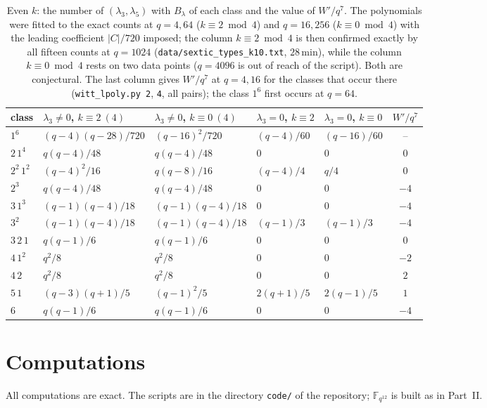 ﻿\documentclass[12pt,a4paper]{amsart}
\theoremstyle{definition}
\newcommand{\F}{\mathbb{F}}
\begin{document}
\begin{table}[H]
\centering
\caption{Even $k$: the number of $(\lambda_3,\lambda_5)$ with $B_\lambda$ of each class and the value of $W'/q^7$. The polynomials were fitted to the exact counts at $q=4,64$ ($k\equiv2\bmod4$) and $q=16,256$ ($k\equiv0\bmod4$) with the leading coefficient $|C|/720$ imposed; the column $k\equiv2\bmod4$ is then confirmed exactly by all fifteen counts at $q=1024$ (\texttt{data/sextic\_types\_k10.txt}, $28$\,min), while the column $k\equiv0\bmod4$ rests on two data points ($q=4096$ is out of reach of the script). Both are conjectural. The last column gives $W'/q^7$ at $q=4,16$ for the classes that occur there (\texttt{witt\_lpoly.py 2}, \texttt{4}, all pairs); the class $1^6$ first occurs at $q=64$.}\label{tab:evenk}
\small
\begin{tabular}{@{}lllllc@{}}
\toprule
class & $\lambda_3\ne0$, $k\equiv2\ (4)$ & $\lambda_3\ne0$, $k\equiv0\ (4)$ & $\lambda_3=0$, $k\equiv2$ & $\lambda_3=0$, $k\equiv0$ & $W'/q^7$\\
\midrule
$1^6$ & $(q-4)(q-28)/720$ & $(q-16)^2/720$ & $(q-4)/60$ & $(q-16)/60$ & --\\
$2\,1^4$ & $q(q-4)/48$ & $q(q-4)/48$ & $0$ & $0$ & $0$\\
$2^2\,1^2$ & $(q-4)^2/16$ & $q(q-8)/16$ & $(q-4)/4$ & $q/4$ & $0$\\
$2^3$ & $q(q-4)/48$ & $q(q-4)/48$ & $0$ & $0$ & $-4$\\
$3\,1^3$ & $(q-1)(q-4)/18$ & $(q-1)(q-4)/18$ & $0$ & $0$ & $-4$\\
$3^2$ & $(q-1)(q-4)/18$ & $(q-1)(q-4)/18$ & $(q-1)/3$ & $(q-1)/3$ & $-4$\\
$3\,2\,1$ & $q(q-1)/6$ & $q(q-1)/6$ & $0$ & $0$ & $0$\\
$4\,1^2$ & $q^2/8$ & $q^2/8$ & $0$ & $0$ & $-2$\\
$4\,2$ & $q^2/8$ & $q^2/8$ & $0$ & $0$ & $2$\\
$5\,1$ & $(q-3)(q+1)/5$ & $(q-1)^2/5$ & $2(q+1)/5$ & $2(q-1)/5$ & $1$\\
$6$ & $q(q-1)/6$ & $q(q-1)/6$ & $0$ & $0$ & $-4$\\
\bottomrule
\end{tabular}
\end{table}

\section{Computations}\label{sec:numerics}
All computations are exact. The scripts are in the directory \texttt{code/} of the repository; $\F_{q^{12}}$ is built as in Part~II.
\end{document}
